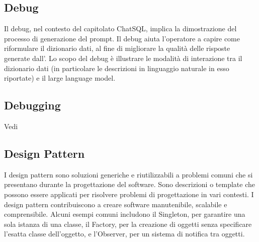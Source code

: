 \vspace{2em}
\subsection*{Debug}
\par Il debug, nel contesto del capitolato ChatSQL, implica la dimostrazione del processo di generazione del prompt. Il debug aiuta l'operatore a capire come riformulare il dizionario dati, al fine di migliorare la qualità delle risposte generate dall'. Lo scopo del debug è illustrare le modalità di interazione tra il dizionario dati (in particolare le descrizioni in linguaggio naturale in esso riportate) e il large language model.


\vspace{2em}
\subsection*{Debugging}
\par Vedi 

\vspace{2em}
\subsection*{Design Pattern}
\par I design pattern sono soluzioni generiche e riutilizzabili a problemi comuni che si presentano durante la progettazione del software. Sono descrizioni o template che possono essere applicati per risolvere problemi di progettazione in vari contesti. I design pattern contribuiscono a creare software manutenibile, scalabile e comprensibile. Alcuni esempi comuni includono il Singleton, per garantire una sola istanza di una classe, il Factory, per la creazione di oggetti senza specificare l'esatta classe dell'oggetto, e l'Observer, per un sistema di notifica tra oggetti.

